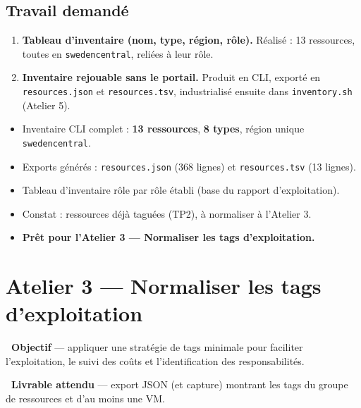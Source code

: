 \documentclass[11pt,a4paper]{article}
\newcommand{\emo}[1]{\raisebox{-0.14em}{\twemoji{#1}}}
\newcommand{\eTarget}{\emo{1f3af}}
\newcommand{\ePackage}{\emo{1f4e6}}
\newcommand{\code}[1]{\texttt{#1}}
\begin{document}
\subsection{Travail demandé}
\begin{enumerate}
  \item \textbf{Tableau d'inventaire (nom, type, région, rôle).} Réalisé : 13 ressources, toutes en \code{swedencentral}, reliées à leur rôle.
  \item \textbf{Inventaire rejouable sans le portail.} Produit en CLI, exporté en \code{resources.json} et \code{resources.tsv}, industrialisé ensuite dans \code{inventory.sh} (Atelier 5).
\end{enumerate}

\begin{etatbox}
\begin{itemize}
  \item Inventaire CLI complet : \textbf{13 ressources}, \textbf{8 types}, région unique \code{swedencentral}.
  \item Exports générés : \code{resources.json} (368 lignes) et \code{resources.tsv} (13 lignes).
  \item Tableau d'inventaire rôle par rôle établi (base du rapport d'exploitation).
  \item Constat : ressources déjà taguées (TP2), à normaliser à l'Atelier 3.
  \item \textbf{Prêt pour l'Atelier 3 — Normaliser les tags d'exploitation.}
\end{itemize}
\end{etatbox}


\section{Atelier 3 — Normaliser les tags d'exploitation}

\begin{fiche}
\textbf{\eTarget~Objectif} — appliquer une stratégie de tags minimale pour faciliter l'exploitation, le suivi des coûts et l'identification des responsabilités.

\textbf{\ePackage~Livrable attendu} — export JSON (et capture) montrant les tags du groupe de ressources et d'au moins une VM.
\end{fiche}
\end{document}

